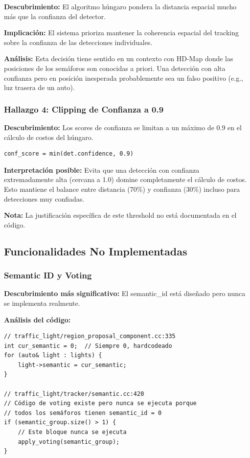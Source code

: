 \textbf{Descubrimiento:} El algoritmo húngaro pondera la distancia espacial mucho más que la confianza del detector.

\textbf{Implicación:} El sistema prioriza mantener la coherencia espacial del tracking sobre la confianza de las detecciones individuales.

\textbf{Análisis:} Esta decisión tiene sentido en un contexto con HD-Map donde las posiciones de los semáforos son conocidas a priori. Una detección con alta confianza pero en posición inesperada probablemente sea un falso positivo (e.g., luz trasera de un auto).

\subsubsection{Hallazgo 4: Clipping de Confianza a 0.9}

\textbf{Descubrimiento:} Los scores de confianza se limitan a un máximo de 0.9 en el cálculo de costos del húngaro.

\begin{codesnippet}
\begin{verbatim}
conf_score = min(det.confidence, 0.9)
\end{verbatim}
\end{codesnippet}

\textbf{Interpretación posible:} Evita que una detección con confianza extremadamente alta (cercana a 1.0) domine completamente el cálculo de costos. Esto mantiene el balance entre distancia (70\%) y confianza (30\%) incluso para detecciones muy confiadas.

\textbf{Nota:} La justificación específica de este threshold no está documentada en el código.

\subsection{Funcionalidades No Implementadas}

\subsubsection{Semantic ID y Voting}

\textbf{Descubrimiento más significativo:} El semantic\_id está diseñado pero nunca se implementa realmente.

\textbf{Análisis del código:}

\begin{codesnippet}
\begin{verbatim}
// traffic_light/region_proposal_component.cc:335
int cur_semantic = 0;  // Siempre 0, hardcodeado
for (auto& light : lights) {
    light->semantic = cur_semantic;
}

// traffic_light/tracker/semantic.cc:420
// Código de voting existe pero nunca se ejecuta porque
// todos los semáforos tienen semantic_id = 0
if (semantic_group.size() > 1) {
    // Este bloque nunca se ejecuta
    apply_voting(semantic_group);
}
\end{verbatim}
\end{codesnippet}

